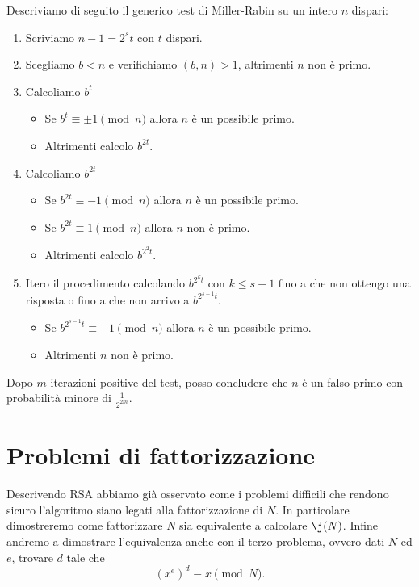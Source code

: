 	Descriviamo di seguito il generico test di Miller-Rabin su un intero \(n\) dispari:
	\begin{enumerate}
		\item Scriviamo \(n-1=2^s t\) con \(t\) dispari.
		\item Scegliamo \(b<n\) e verifichiamo \((b,n)>1\), altrimenti \(n\) non è primo.
		\item Calcoliamo \(b^t\)
		\begin{itemize}
			\item Se \(b^t \equiv \pm 1 \pmod{n}\) allora \(n\) è un possibile primo.
			\item Altrimenti calcolo \(b^{2t}\).
		\end{itemize}
		\item Calcoliamo \(b^{2t}\)
		\begin{itemize}
			\item Se \(b^{2t} \equiv -1 \pmod{n}\) allora \(n\) è un possibile primo.
			\item Se \(b^{2t} \equiv 1 \pmod{n}\) allora \(n\) non è primo.
			\item Altrimenti calcolo \(b^{2^2 t}\).
		\end{itemize}
		\item Itero il procedimento calcolando \(b^{2^k t}\) con \(k \le s-1\) fino a che non ottengo una risposta o fino a che non arrivo a \(b^{2^{s-1}t}\).
		\begin{itemize}
			\item Se \(b^{2^{s-1}t}\equiv -1 \pmod{n}\) allora \(n\) è un possibile primo.
			\item Altrimenti \(n\) non è primo.
		\end{itemize}
	\end{enumerate}

	\begin{oss}
	Dopo \(m\) iterazioni positive del test, posso concludere che \(n\) è un falso primo con probabilità minore di \(\frac{1}{2^{2m}}\).
	\end{oss}
%
%
\section{Problemi di fattorizzazione}

	Descrivendo RSA abbiamo già osservato come i problemi difficili che rendono sicuro l'algoritmo siano legati alla fattorizzazione di \(N\).
	In particolare dimostreremo come fattorizzare \(N\) sia equivalente a calcolare \(\j(N)\).
	Infine andremo a dimostrare l'equivalenza anche con il terzo problema, ovvero dati \(N\) ed \(e\), trovare \(d\) tale che
		\[
		{(x^e)}^d \equiv x \pmod{N}.
		\]


